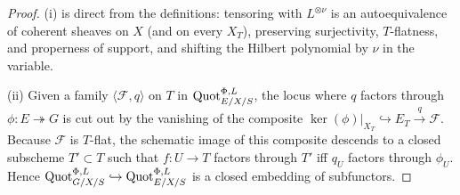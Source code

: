 \begin{proof}
  
  (i) is direct from the definitions: tensoring with \(L^{\otimes \nu}\) is
  an autoequivalence of coherent sheaves on \(X\) (and on every \(X_T\)),
  preserving surjectivity, \(T\)-flatness, and properness of support, and
  shifting the Hilbert polynomial by \(\nu\) in the variable.

  (ii) Given a family \(\langle \mathcal{F}, q\rangle\) on \(T\) in
  \(\operatorname{Quot}^{\Phi,L}_{E/X/S}\), the locus where \(q\) factors through
  \(\phi : E \twoheadrightarrow G\) is cut out by the vanishing of the
  composite \(\ker(\phi)|_{X_T} \hookrightarrow E_T \xrightarrow{q}
  \mathcal{F}\). Because \(\mathcal{F}\) is \(T\)-flat, the schematic image of
  this composite descends to a closed subscheme \(T' \subset T\) such that
  \(f : U \to T\) factors through \(T'\) iff \(q_U\) factors through \(\phi_U\).
  Hence \(\operatorname{Quot}^{\Phi,L}_{G/X/S} \hookrightarrow \operatorname{Quot}^{\Phi,L}_{E/X/S}\)
  is a closed embedding of subfunctors.
\end{proof}

